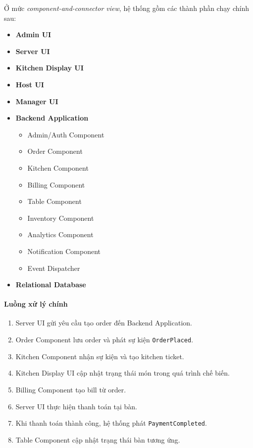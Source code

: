 \documentclass[12pt,a4paper]{article}
\begin{document}
Ở mức \textit{component-and-connector view}, hệ thống gồm các thành phần chạy chính sau:
\begin{itemize}
    \item \textbf{Admin UI}
    \item \textbf{Server UI}
    \item \textbf{Kitchen Display UI}
    \item \textbf{Host UI}
    \item \textbf{Manager UI}
    \item \textbf{Backend Application}
    \begin{itemize}
        \item Admin/Auth Component
        \item Order Component
        \item Kitchen Component
        \item Billing Component
        \item Table Component
        \item Inventory Component
        \item Analytics Component
        \item Notification Component
        \item Event Dispatcher
    \end{itemize}
    \item \textbf{Relational Database}
\end{itemize}

\paragraph{Luồng xử lý chính}
\begin{enumerate}
    \item Server UI gửi yêu cầu tạo order đến Backend Application.
    \item Order Component lưu order và phát sự kiện \texttt{OrderPlaced}.
    \item Kitchen Component nhận sự kiện và tạo kitchen ticket.
    \item Kitchen Display UI cập nhật trạng thái món trong quá trình chế biến.
    \item Billing Component tạo bill từ order.
    \item Server UI thực hiện thanh toán tại bàn.
    \item Khi thanh toán thành công, hệ thống phát \texttt{PaymentCompleted}.
    \item Table Component cập nhật trạng thái bàn tương ứng.
\end{enumerate}
\end{document}
